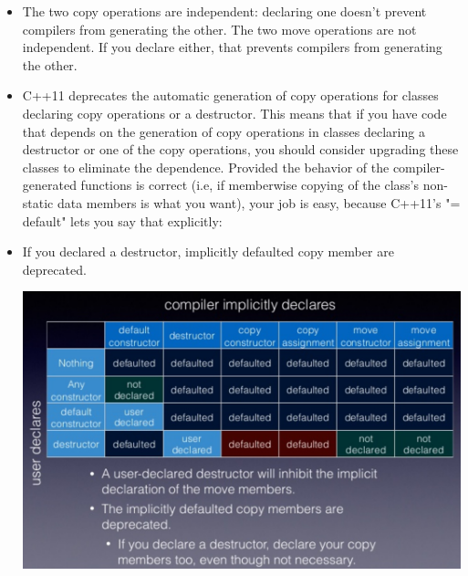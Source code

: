 \documentclass[a4paper,11pt,twoside]{book}
\begin{document}
\begin{itemize}
\item The two copy operations are independent: declaring one doesn't prevent compilers from generating the other. The two move operations are not independent. If you declare either, that prevents compilers from generating the other.

\item C++11 deprecates the automatic generation of copy operations for classes declaring copy operations or a destructor. This means that if you have code that depends on the generation of copy operations in classes declaring a destructor or one of the copy operations, you should consider upgrading these classes to eliminate the dependence. Provided the behavior of the compiler-generated functions is correct (i.e, if memberwise copying of the class's non-static data members is what you want), your job is easy, because C++11's "= default" lets you say that explicitly:

\item If you declared a destructor, implicitly defaulted copy member are deprecated.  \\

\begin{center}
\includegraphics[scale=0.8]{pics/sm4.png} \newline
\end{center}


\end{itemize}
\end{document}
